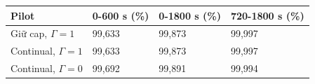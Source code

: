 \par\smallskip\noindent\begin{tabularx}{\linewidth}{@{}P{4.2cm}XXX@{}}\toprule
\textbf{Pilot} & \textbf{0-600 s (\%)} & \textbf{0-1800 s (\%)} & \textbf{720-1800 s (\%)} \\
\midrule
Giữ cap, $\Gamma=1$ & 99{,}633 & 99{,}873 & 99{,}997 \\
Continual, $\Gamma=1$ & 99{,}633 & 99{,}873 & 99{,}997 \\
Continual, $\Gamma=0$ & 99{,}692 & 99{,}891 & 99{,}994 \\
\bottomrule\end{tabularx}\par\smallskip
